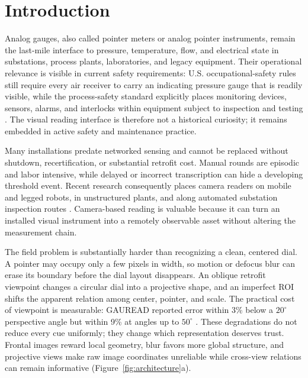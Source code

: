 \documentclass[electronics,article,submit,oneauthor]{Definitions/mdpi}
\begin{document}
\section{Introduction}
\label{sec:introduction}

Analog gauges, also called pointer meters or analog pointer instruments, remain the last-mile interface to pressure, temperature, flow, and electrical state in substations, process plants, laboratories, and legacy equipment. Their operational relevance is visible in current safety requirements: U.S. occupational-safety rules still require every air receiver to carry an indicating pressure gauge that is readily visible, while the process-safety standard explicitly places monitoring devices, sensors, alarms, and interlocks within equipment subject to inspection and testing \cite{osha1910airreceivers,osha1910psm}. The visual reading interface is therefore not a historical curiosity; it remains embedded in active safety and maintenance practice.

Many installations predate networked sensing and cannot be replaced without shutdown, recertification, or substantial retrofit cost. Manual rounds are episodic and labor intensive, while delayed or incorrect transcription can hide a developing threshold event. Recent research consequently places camera readers on mobile and legged robots, in unstructured plants, and along automated substation inspection routes \cite{howells2021analogue,dong2021vdn,milana2022gauges,reitsma2024underpressure,chu2025prikmet}. Camera-based reading is valuable because it can turn an installed visual instrument into a remotely observable asset without altering the measurement chain.

The field problem is substantially harder than recognizing a clean, centered dial. A pointer may occupy only a few pixels in width, so motion or defocus blur can erase its boundary before the dial layout disappears. An oblique retrofit viewpoint changes a circular dial into a projective shape, and an imperfect ROI shifts the apparent relation among center, pointer, and scale. The practical cost of viewpoint is measurable: GAUREAD reported error within 3\% below a $20^{\circ}$ perspective angle but within 9\% at angles up to $50^{\circ}$ \cite{milana2022gauges}. These degradations do not reduce every cue uniformly; they change which representation deserves trust. Frontal images reward local geometry, blur favors more global structure, and projective views make raw image coordinates unreliable while cross-view relations can remain informative (Figure~\ref{fig:architecture}a).
\end{document}
